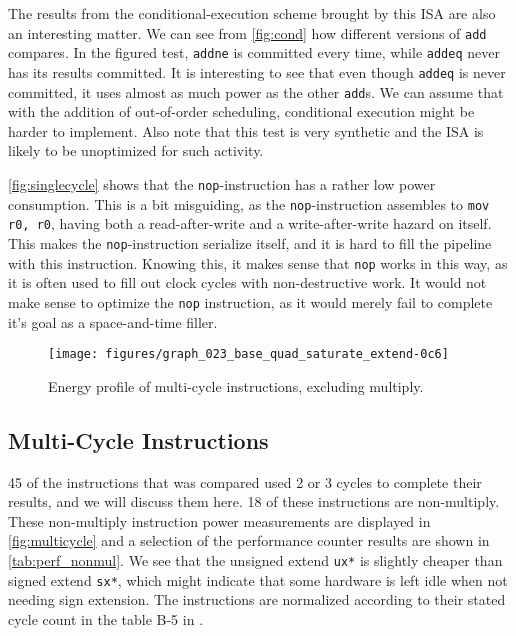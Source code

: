 The results from the conditional-execution scheme brought by this ISA are also
an interesting matter. We can see from \autoref{fig:cond} how different versions
of \texttt{add} compares. In the figured test, \texttt{addne} is committed every
time, while \texttt{addeq} never has its results committed. It is interesting to
see that even though \texttt{addeq} is never committed, it uses almost as much
power as the other \texttt{add}s. We can assume that with the addition of
out-of-order scheduling, conditional execution might be harder to implement.
Also note that this test is very synthetic and the ISA is likely to be
unoptimized for such activity.

\autoref{fig:singlecycle} shows that the \texttt{nop}-instruction has a rather
low power consumption. This is a bit misguiding, as the \texttt{nop}-instruction
assembles to \texttt{mov r0, r0}, having both a read-after-write and a
write-after-write hazard on itself. This makes the \texttt{nop}-instruction
serialize itself, and it is hard to fill the pipeline with this instruction.
Knowing this, it makes sense that \texttt{nop} works in this way, as it is often
used to fill out clock cycles with non-destructive work. It would not make sense
to optimize the \texttt{nop} instruction, as it would merely fail to complete
it's goal as a space-and-time filler.

\begin{figure}
    \centering
    \texttt{[image: figures/graph\_023\_base\_quad\_saturate\_extend-0c6]}
    \caption{Energy profile of multi-cycle instructions, excluding multiply.}
    \label{fig:multicycle}
\end{figure}


\subsection{Multi-Cycle Instructions}


45 of the instructions that was compared used 2 or 3 cycles to complete their
results, and we will discuss them here. 18 of these instructions are
non-multiply. These non-multiply instruction power measurements are displayed in
\autoref{fig:multicycle} and a selection of the performance counter results are
shown in \autoref{tab:perf_nonmul}. We see that the unsigned extend \texttt{ux*}
is slightly cheaper than signed extend \texttt{sx*}, which might indicate that
some hardware is left idle when not needing sign extension. The instructions are
normalized according to their stated cycle count in the table B-5 in
\cite{armtech}.

